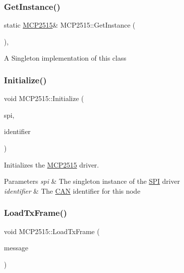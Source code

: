 \subsubsection{\texorpdfstring{Get\+Instance()}{GetInstance()}}
{\footnotesize\ttfamily static \hyperlink{class_m_c_p2515}{M\+C\+P2515}\& M\+C\+P2515\+::\+Get\+Instance (\begin{DoxyParamCaption}{ }\end{DoxyParamCaption})\hspace{0.3cm}{\ttfamily [inline]}, {\ttfamily [static]}}

A Singleton implementation of this class \hypertarget{class_m_c_p2515_aff0381b69d9e68688cde4608d716bd25}{}\label{class_m_c_p2515_aff0381b69d9e68688cde4608d716bd25} 
\subsubsection{\texorpdfstring{Initialize()}{Initialize()}}
{\footnotesize\ttfamily void M\+C\+P2515\+::\+Initialize (\begin{DoxyParamCaption}\item[{\hyperlink{class_s_p_i_1_1_s_p_i}{S\+P\+I\+::\+S\+PI} $\ast$}]{spi,  }\item[{uint16\+\_\+t}]{identifier }\end{DoxyParamCaption})}

Initializes the \hyperlink{class_m_c_p2515}{M\+C\+P2515} driver. 
\begin{DoxyParams}{Parameters}
{\em spi} & The singleton instance of the \hyperlink{namespace_s_p_i}{S\+PI} driver \\
\hline
{\em identifier} & The \hyperlink{class_c_a_n}{C\+AN} identifier for this node \\
\hline
\end{DoxyParams}
\hypertarget{class_m_c_p2515_a98ab4323b49fc629871584ce8f22a617}{}\label{class_m_c_p2515_a98ab4323b49fc629871584ce8f22a617} 
\subsubsection{\texorpdfstring{Load\+Tx\+Frame()}{LoadTxFrame()}}
{\footnotesize\ttfamily void M\+C\+P2515\+::\+Load\+Tx\+Frame (\begin{DoxyParamCaption}\item[{\hyperlink{struct_can_message}{Can\+Message} \&}]{message }\end{DoxyParamCaption})\hspace{0.3cm}{\ttfamily [private]}}

